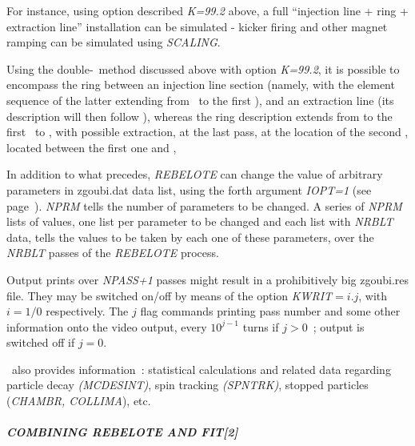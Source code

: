{\noindent For instance, using option described \textsl{K=99.2} above, a full ``injection line + ring + extraction line'' installation 
can be simulated - kicker firing  and other magnet ramping can be simulated using \textsl{SCALING}. 

\noindent Using the double-\LABEL\ method discussed above with option \textsl{K=99.2}, it is possible to encompass the ring between 
an injection line section (namely, with the element sequence of the latter extending from \OBJET\ to the first \LABEL), 
and an extraction line (its description will then follow \REBELOTE), 
whereas the ring description extends  from  to the first \LABEL\ to \REBELOTE, 
with possible extraction, at the last pass, at the location of the second \LABEL, located between the first one and \REBELOTE, 

\bigskip

\noindent In addition to what precedes,  \textsl{REBELOTE} can change the value of arbitrary parameters in zgoubi.dat 
data list, using the forth argument \textsl{IOPT=1} (see page~\pageref{REBEL_IOPT}). 
\textsl{NPRM} tells the number of parameters to be changed. 
A series of   \textsl{NPRM} lists of values, one list per parameter to be changed and each list 
with \textsl{NRBLT} data, tells the 
 values to be taken by each one of these parameters, over the \textsl{NRBLT} passes of the 
\textsl{REBELOTE} process.  

\bigskip

\noindent Output prints over \textsl{NPASS+1} passes  might result in a
prohibitively big zgoubi.res file. They may be switched on/off  by means of the option 
\mbox{\textsl{KWRIT}$= i.j$}, with $i=1/0$ respectively. The $j$ flag commands printing 
pass number and some other information onto the video output, every $10^{j-1}$ turns if $j>0$~; output is switched  
off if $j=0$. 

  
\bigskip

\noindent\REBELOTE\ also provides information~: statistical calculations and related 
data regarding particle decay \textsl{(MCDESINT)}, spin tracking  
\textsl{(SPNTRK)}, stopped particles (\textsl{CHAMBR,
 COLLIMA}), etc.  




\clearpage

\paragraph{\textsl{COMBINING REBELOTE AND FIT[2]} }    %


}
